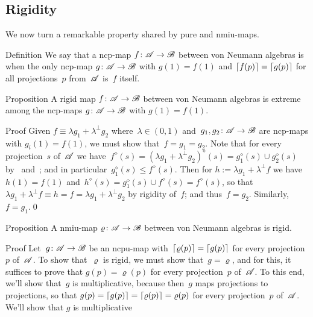 \documentclass[a]{subfiles}
\begin{document}
\subsection{Rigidity}
\begin{parsec}%
\begin{point}%
We now turn a remarkable property shared
by pure and nmiu-maps.
\end{point}
\begin{point}[rigid]{Definition}%
We say that a ncp-map $f\colon \mathscr{A}\to\mathscr{B}$
between von Neumann algebras is %
when the only ncp-map $g\colon \mathscr{A}\to\mathscr{B}$
with $g(1)=f(1)$ and $\left\lceil f(p)\right\rceil=\left\lceil g(p)\right\rceil$ for all
projections~$p$ from~$\mathscr{A}$ is~$f$ itself.
\end{point}
\begin{point}{Proposition}%
A rigid map $f\colon \mathscr{A}\to\mathscr{B}$
between von Neumann algebras
is extreme among the ncp-maps $g\colon \mathscr{A}\to\mathscr{B}$
with $g(1)=f(1)$.
\begin{point}{Proof}%
Given $f\equiv \lambda g_1 + \lambda^\perp g_2$
where~$\lambda\in(0,1)$ 
and~$g_1,g_2\colon \mathscr{A}\to\mathscr{B}$
are ncp-maps with $g_i(1)=f(1)$,
we must show that~$f=g_1=g_2$.
Note that for every projection~$s$
of~$\mathscr{A}$
we have~$f^\diamond(s) = (\lambda g_1+\lambda^\perp g_2)^\diamond(s)
= g_1^\diamond(s)\cup g_2^\diamond(s)$
by~ and~;
and in particular~$g_1^\diamond(s)\leq f^\diamond(s)$.
Then for $h:=\lambda  g_1 + \lambda^\perp f$
we have $h(1)=f(1)$
and~$h^\diamond(s) = g_1^\diamond(s)\cup f^\diamond(s)
= f^\diamond(s)$,
so that~$\lambda g_1 + \lambda^\perp f \equiv 
h=f = \lambda g_1 +\lambda^\perp g_2$ by rigidity of~$f$;
and thus~$f=g_2$.
Similarly, $f=g_1$.\qed%
\end{point}
\end{point}
\begin{point}{Proposition}%
A nmiu-map $\varrho\colon \mathscr{A}\to\mathscr{B}$
between von Neumann algebras is rigid.
\begin{point}{Proof}%
Let~$g\colon \mathscr{A}\to\mathscr{B}$
be an ncpu-map
with~$\left\lceil\varrho(p)\right\rceil=\left\lceil g(p)\right\rceil$
for every projection~$p$ of~$\mathscr{A}$.
To show that~$\varrho$ is rigid,
we must show that~$g=\varrho$,
and for this, it suffices to prove that $g(p)=\varrho(p)$
for every projection~$p$ of~$\mathscr{A}$.
To this end, we'll show that~$g$ is multiplicative,
because then~$g$ maps projections to projections,
so that $g(p)=\left\lceil g(p)\right\rceil=\left\lceil\varrho(p)\right\rceil=\varrho(p)$
for every projection~$p$ of~$\mathscr{A}$.
We'll show that $g$ is multiplicative

\end{point}
\end{point}
\end{parsec}
\end{document}
